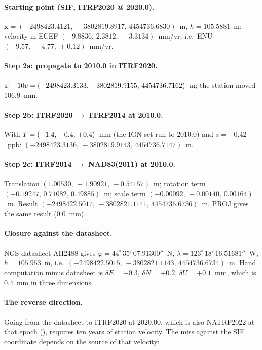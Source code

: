 \documentclass[main.tex]{subfiles}
\begin{document}
\paragraph{Starting point (SIF, ITRF2020 @ 2020.0).}
$\bm{x} = (-2498423.4121,\,-3802819.8917,\,4454736.6830)$~m,
$h = 105.5881$~m; velocity in ECEF
$(-9.8836,\,2.3812,\,-3.3134)$~mm/yr, i.e.\ ENU
$(-9.57,\,-4.77,\,+0.12)$~mm/yr.

\paragraph{Step 2a: propagate to 2010.0 in ITRF2020.}
$x - 10v = (-2498423.3133,\,-3802819.9155,\,4454736.7162)$~m;
the station moved $106.9$~mm.

\paragraph{Step 2b: ITRF2020 $\to$ ITRF2014 at 2010.0.}
With $T = (-1.4,\,-0.4,\,+0.4)$~mm (the IGN set run to $2010.0$)
and $s = -0.42$~ppb:
$(-2498423.3136,\,-3802819.9143,\,4454736.7147)$~m.

\paragraph{Step 2c: ITRF2014 $\to$ NAD83(2011) at 2010.0.}
Translation $(1.00530,\,-1.90921,\,-0.54157)$~m; rotation term
$(-0.19247,\,0.71082,\,0.49885)$~m; scale term
$(-0.00092,\,-0.00140,\,0.00164)$~m.  Result
$(-2498422.5017,\,-3802821.1141,\,4454736.6736)$~m.  PROJ gives the
same result ($0.0$~mm).

\paragraph{Closure against the datasheet.}  NGS datasheet AH2488 gives
$\varphi = 44^\circ\,35'\,07.91300''$~N,
$\lambda = 123^\circ\,18'\,16.51681''$~W, $h = 105.953$~m, i.e.\
$(-2498422.5015,\,-3802821.1143,\,4454736.6734)$~m.  Hand computation
minus datasheet is $\delta E = -0.3$, $\delta N = +0.2$,
$\delta U = +0.1$~mm, which is $0.4$~mm in three dimensions.

\paragraph{The reverse direction.}  Going from the datasheet to ITRF2020
at $2020.00$, which is also NATRF2022 at that epoch
(), requires ten years of station velocity.  The
miss against the SIF coordinate depends on the source of that velocity:
\end{document}

